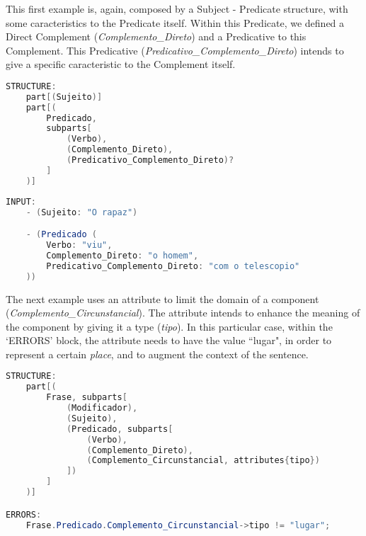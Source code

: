 This first example is, again, composed by a Subject - Predicate structure, with some caracteristics to the Predicate itself.
Within this Predicate, we defined a Direct Complement (\textit{Complemento\_Direto}) and a Predicative to this Complement. 
This Predicative (\textit{Predicativo\_Complemento\_Direto}) intends to give a specific caracteristic to the Complement itself.

\begin{center}
\begin{minipage}{14cm}
\begin{lstlisting}[language=java, basicstyle=\small, label={lst:example_structure1}, caption=Example of a sentence structure]
STRUCTURE:
    part[(Sujeito)]
    part[(
        Predicado,
        subparts[
            (Verbo),
            (Complemento_Direto),
            (Predicativo_Complemento_Direto)?
        ]
    )]
\end{lstlisting}
\end{minipage}
\end{center}

\begin{center}
\begin{minipage}{14cm}
\begin{lstlisting}[language=java, basicstyle=\small, label={lst:example_input1}, caption=Example of a sentence input]
INPUT:
    - (Sujeito: "O rapaz")

    - (Predicado (
        Verbo: "viu",
        Complemento_Direto: "o homem",
        Predicativo_Complemento_Direto: "com o telescopio"
    ))
\end{lstlisting}
\end{minipage}
\end{center}


The next example uses an attribute to limit the domain of a component (\textit{Complemento\_Circunstancial}).
The attribute intends to enhance the meaning of the component by giving it a type (\textit{tipo}).
In this particular case, within the `ERRORS' block, the attribute needs to have the value ``lugar", in order to represent a certain \textit{place}, 
and to augment the context of the sentence.

\begin{center}
\begin{minipage}{15cm}
\begin{lstlisting}[language=java, basicstyle=\small, label={lst:example_structure3}, caption=Example of a sentence structure]
STRUCTURE:
    part[(
        Frase, subparts[
            (Modificador),
            (Sujeito),
            (Predicado, subparts[
                (Verbo),
                (Complemento_Direto),
                (Complemento_Circunstancial, attributes{tipo})
            ])
        ]
    )]

ERRORS:
    Frase.Predicado.Complemento_Circunstancial->tipo != "lugar";
\end{lstlisting}
\end{minipage}
\end{center}

